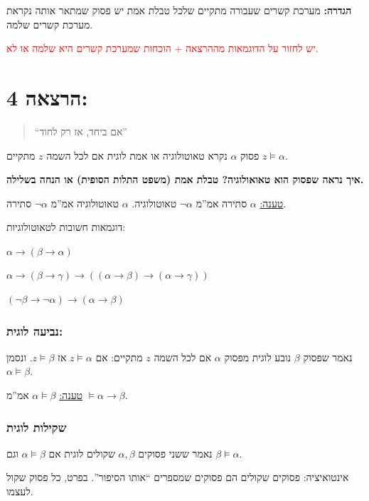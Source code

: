 \documentclass[12pt,a4paper]{article}
\begin{document}
\textbf{הגדרה:} מערכת קשרים שעבורה מתקיים שלכל טבלת אמת יש פסוק שמתאר אותה נקראת מערכת קשרים שלמה.

\textcolor{red}{יש לחזור על הדוגמאות מההרצאה + הוכחות שמערכת קשרים היא שלמה או לא.}

\section*{הרצאה 4:}

\begin{quote}
``אם ביחד, אז רק לחוד''
\end{quote}

פסוק $\alpha$ נקרא טאוטולוגיה או אמת לוגית אם לכל השמה $z$ מתקיים $z\vDash\alpha$.

\textbf{איך נראה שפסוק הוא טאואולוגיה? טבלת אמת (משפט התלות הסופית) או הנחה בשלילה.}

\underline{טענה:} $\alpha$ סתירה אמ''מ $\lnot\alpha$ טאוטולוגיה. $\alpha$ טאוטולוגיה אמ''מ $\lnot\alpha$ סתירה.

דוגמאות חשובות לטאוטולוגיות:

$\alpha\rightarrow(\beta\rightarrow\alpha)$

$\alpha\rightarrow(\beta\rightarrow\gamma)\rightarrow((\alpha\rightarrow\beta)\rightarrow(\alpha\rightarrow\gamma))$

$(\lnot\beta\rightarrow\lnot\alpha)\rightarrow(\alpha\rightarrow\beta)$

\subsubsection*{נביעה לוגית:}

נאמר שפסוק $\beta$ נובע לוגית מפסוק $\alpha$ אם לכל השמה $z$ מתקיים: אם $z\vDash\alpha$ אז $z\vDash\beta$. ונסמן $\alpha\vDash\beta$.

\underline{טענה:} $\alpha\vDash\beta$ אמ''מ $\vDash\alpha\rightarrow\beta$.

\subsubsection*{שקילות לוגית}

נאמר ששני פסוקים $\alpha,\beta$ שקולים לוגית אם $\alpha\vDash\beta$ וגם $\beta\vDash\alpha$.

אינטואיציה: פסוקים שקולים הם פסוקים שמספרים ``אותו הסיפור''. בפרט, כל פסוק שקול לעצמו.
\end{document}
